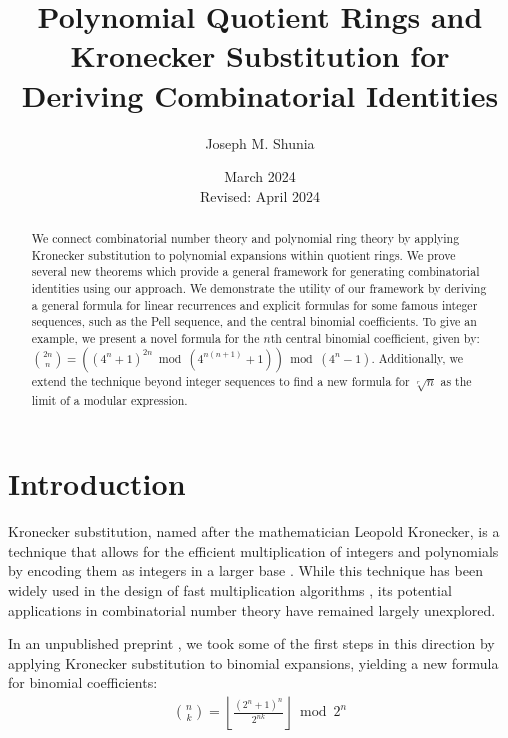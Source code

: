 \documentclass[11pt,reqno]{article}
\theoremstyle{plain}
\theoremstyle{definition}
\newcommand{\floor}[1]{\left\lfloor #1 \right\rfloor}
\begin{document}
\title{Polynomial Quotient Rings and Kronecker Substitution for Deriving Combinatorial Identities}
\author{Joseph M. Shunia}
\date{March 2024 \\ \small Revised: April 2024 \normalsize}

\maketitle

\begin{abstract}
We connect combinatorial number theory and polynomial ring theory by applying Kronecker substitution to polynomial expansions within quotient rings. We prove several new theorems which provide a general framework for generating combinatorial identities using our approach. We demonstrate the utility of our framework by deriving a general formula for linear recurrences and explicit formulas for some famous integer sequences, such as the Pell sequence, and the central binomial coefficients. To give an example, we present a novel formula for the $n$th central binomial coefficient, given by: $\binom{2n}{n} = ((4^n + 1)^{2n} \bmod{(4^{n(n+1)} + 1)}) \bmod{(4^n-1)}$. Additionally, we extend the technique beyond integer sequences to find a new formula for $\sqrt[r]{n}$ as the limit of a modular expression.
\end{abstract}

\section{Introduction}
Kronecker substitution, named after the mathematician Leopold Kronecker, is a technique that allows for the efficient multiplication of integers and polynomials by encoding them as integers in a larger base \cite{kronecker1882}. While this technique has been widely used in the design of fast multiplication algorithms \cite{harvey2009kronecker, harvey2014faster, albrecht2018implementing, bos2020postquantum, greuet2022modular}, its potential applications in combinatorial number theory have remained largely unexplored.

In an unpublished preprint \cite{shunia2023simple}, we took some of the first steps in this direction by applying Kronecker substitution to binomial expansions, yielding a new formula for binomial coefficients:
\begin{align*}
    \binom{n}{k} = \floor{\frac{(2^n+1)^n}{2^{n k}}} \bmod{2^n}
\end{align*}
\end{document}
